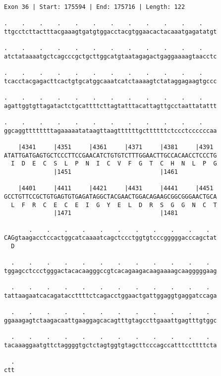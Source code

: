 \documentclass{article}
\begin{document}
\begin{Verbatim}
Exon 36 | Start: 175594 | End: 175716 | Length: 122
 
.    .    .    .    .    .    .    .    .    .    .    .    
ttgcctcttactttacgaaagtgatgtggacctacgtggaacactacaaatgagatatgt
  
.    .    .    .    .    .    .    .    .    .    .    .    
atctataaaatgctcagcccgctgcttggcatgtaatagagactgaggaaaagtaacctc
  
.    .    .    .    .    .    .    .    .    .    .    .    
tcacctacgagacttcactgtgcatggcaaatcatctaaaagtctataggagaagtgccc
  
.    .    .    .    .    .    .    .    .    .    .    .    
agattggtgttagatactctgcattttcttagtatttacattagttgcctaattatattt
  
.    .    .    .    .    .    .    .    .    .    .    .    
ggcaggttttttttagaaaaatataagttaagttttttgcttttttctccctccccccaa
  
    |4341     |4351     |4361     |4371     |4381     |4391 
ATATTGATGAGTGCTCCCTTCCGAACATCTGTGTCTTTGGAACTTGCCACAACCTCCCTG
  I  D  E  C  S  L  P  N  I  C  V  F  G  T  C  H  N  L  P  G
              |1451                         |1461           
  
    |4401     |4411     |4421     |4431     |4441     |4451 
GCCTGTTCCGCTGTGAGTGTGAGATAGGCTACGAACTGGACAGAAGCGGCGGGAACTGCA
  L  F  R  C  E  C  E  I  G  Y  E  L  D  R  S  G  G  N  C  T
              |1471                         |1481           
  
       .    .    .    .    .    .    .    .    .    .    .  
CAGgtaagacctccactggcatcaaaatcagctccctggtgtcccgggggacccagctat
  D                                                         
  
  .    .    .    .    .    .    .    .    .    .    .    .  
tggagcctccctgggactacacaagggccgtcacagaagacaagaaaagcaagggggaag
  
  .    .    .    .    .    .    .    .    .    .    .    .  
tattaagaatcacagataccttttctcagacctggaactgattggaggtgaggatccaga
  
  .    .    .    .    .    .    .    .    .    .    .    .  
ggaaagagtctaagacaattgaaggagcacagtttgtagccttgaaattgagtttgtggc
  
  .    .    .    .    .    .    .    .    .    .    .    .  
tacaaaggaatgttctaggggtgctctagtggtgtagcttcccagccatttccttttcta
  
  .
ctt
\end{Verbatim}
\newpage
\end{document}

